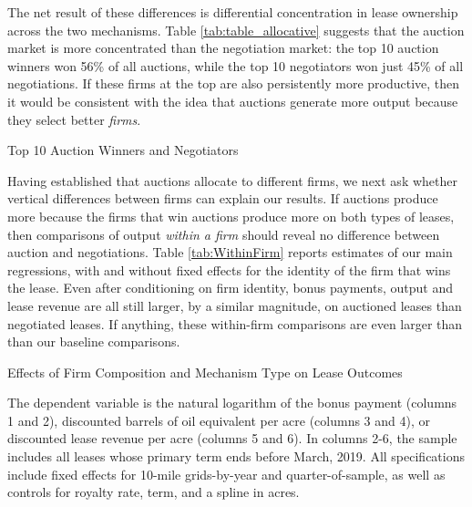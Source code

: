 \documentclass[12pt]{article}
\begin{document}
The net result of these differences is differential concentration in lease ownership across the two mechanisms. Table \ref{tab:table_allocative} suggests that the auction market is more concentrated than the negotiation market: the top 10 auction winners won 56\% of all auctions, while the top 10 negotiators won just 45\% of all negotiations.  If these firms at the top are also persistently more productive, then it would be consistent with the idea that auctions generate more output because they select better \emph{firms}.

\begin{table}[htbp]
\begin{center}
\begin{threeparttable}
\caption{Top 10 Auction Winners and Negotiators}
\label{tab:table_allocative}
 	\small
   	            
\end{threeparttable}
\end{center}
\end{table}

Having established that auctions allocate to different firms, we next ask whether vertical differences between firms can explain our results. If auctions produce more because the firms that win auctions produce more on both types of leases, then comparisons of output \textit{within a firm} should reveal no difference between auction and negotiations.  Table \ref{tab:WithinFirm} reports estimates of our main regressions, with and without fixed effects for the identity of the firm that wins the lease. Even after conditioning on firm identity, bonus payments, output and lease revenue are all still larger, by a similar magnitude, on auctioned leases than negotiated leases.  If anything, these within-firm comparisons are even larger than than our baseline comparisons. 

\begin{table}[htbp]
	\begin{center}
	\begin{threeparttable}
	\caption{Effects of Firm Composition and Mechanism Type on Lease Outcomes}
	\label{tab:WithinFirm}
	\small
	    
		\begin{tablenotes}
			\footnotesize
			\item The dependent variable is the natural logarithm of the bonus payment (columns 1 and 2), discounted barrels of oil equivalent per acre (columns 3 and 4), or discounted lease revenue per acre (columns 5 and 6).  In columns 2-6, the sample includes all leases whose primary term ends before March, 2019.  All specifications include fixed effects for 10-mile grids-by-year and quarter-of-sample, as well as controls for royalty rate, term, and a spline in acres.   
			\end{tablenotes}        
	\end{threeparttable}
	\end{center}
\end{table}
\end{document}
